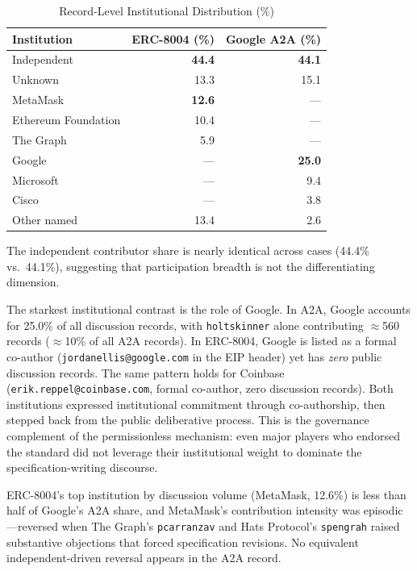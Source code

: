 \documentclass[conference]{IEEEtran}
\begin{document}
\begin{table}[h]
\caption{Record-Level Institutional Distribution (\%)}
\label{tab:institutions}
\centering
\begin{tabular}{lrr}
\toprule
\textbf{Institution} & \textbf{ERC-8004 (\%)} & \textbf{Google A2A (\%)} \\
\midrule
Independent          & \textbf{44.4} & \textbf{44.1} \\
Unknown              & 13.3 & 15.1 \\
MetaMask             & \textbf{12.6} & — \\
Ethereum Foundation  & 10.4 & — \\
The Graph            & 5.9 & — \\
Google               & — & \textbf{25.0} \\
Microsoft            & — & 9.4 \\
Cisco                & — & 3.8 \\
Other named          & 13.4 & 2.6 \\
\bottomrule
\end{tabular}
\end{table}

The independent contributor share is nearly identical across cases (44.4\%
vs.\ 44.1\%), suggesting that participation breadth is not the differentiating
dimension.

The starkest institutional contrast is the role of Google. In A2A, Google
accounts for 25.0\% of all discussion records, with \texttt{holtskinner}
alone contributing $\approx$560 records ($\approx$10\% of all A2A records).
In ERC-8004, Google is listed as a formal co-author (\texttt{jordanellis@google.com}
in the EIP header) yet has \textit{zero} public discussion records. The same
pattern holds for Coinbase (\texttt{erik.reppel@coinbase.com}, formal co-author,
zero discussion records). Both institutions expressed institutional commitment
through co-authorship, then stepped back from the public deliberative process.
This is the governance complement of the permissionless mechanism: even major
players who endorsed the standard did not leverage their institutional weight
to dominate the specification-writing discourse.

ERC-8004's top institution by discussion volume (MetaMask, 12.6\%) is less
than half of Google's A2A share, and MetaMask's contribution intensity was
episodic---reversed when The Graph's \texttt{pcarranzav} and Hats Protocol's
\texttt{spengrah} raised substantive objections that forced specification
revisions. No equivalent independent-driven reversal appears in the A2A record.
\end{document}
